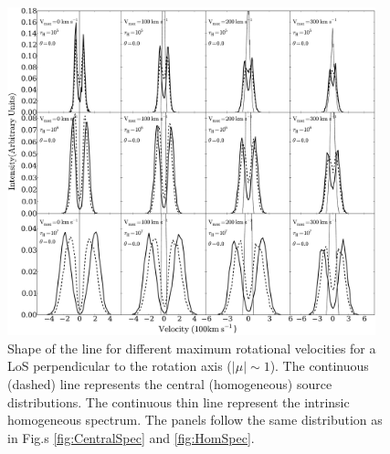 \begin{figure}
\begin{center}
\includegraphics[width=0.95\textwidth]{../Figures/f4-2.pdf}
\end{center}
\caption{Shape of the \ly line for different maximum rotational
velocities for a LoS perpendicular to the rotation axis
($|\mu|\sim 1$). The continuous (dashed) line represents the central
(homogeneous) source distributions. The continuous thin line
represent the intrinsic homogeneous spectrum. The panels follow the same
distribution as in Fig.s \ref{fig:CentralSpec} and \ref{fig:HomSpec}.
\label{fig:differentvelocities2}}
\end{figure}
